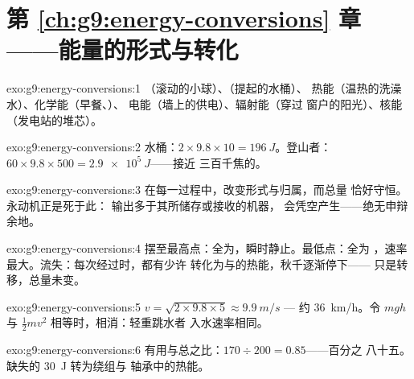 \section*{第 \ref{ch:g9:energy-conversions} 章——能量的形式与转化}

\begin{solution}{exo:g9:energy-conversions:1}
（滚动的小球）、（提起的水桶）、
热能（温热的洗澡水）、化学能（早餐、）、
电能（墙上的供电）、辐射能（穿过
窗户的阳光）、核能（发电站的堆芯）。
\end{solution}

\begin{solution}{exo:g9:energy-conversions:2}
水桶：$2 \times 9.8 \times 10 = \qty{196}{J}$。登山者：$60
\times 9.8 \times 500 = \qty{2.9e5}{J}$——接近
三百千焦的。
\end{solution}

\begin{solution}{exo:g9:energy-conversions:3}
在每一过程中，改变形式与归属，而总量
恰好守恒。永动机正是死于此：
输出多于其所储存或接收的机器，
会凭空产生——绝无申辩余地。
\end{solution}

\begin{solution}{exo:g9:energy-conversions:4}
摆至最高点：全为，瞬时静止。最低点：全为
，速率最大。流失：每次经过时，都有少许
转化为与的热能，秋千逐渐停下——
只是转移，总量未变。
\end{solution}

\begin{solution}{exo:g9:energy-conversions:5}
$v = \sqrt{2 \times 9.8 \times 5} \approx \qty{9.9}{m/s}$ ---
约 \qty{36}{km/h}。令 $m g h$ 与
$\frac12 m v^2$ 相等时，相消：轻重跳水者
入水速率相同。
\end{solution}

\begin{solution}{exo:g9:energy-conversions:6}
有用与总之比：$170 \div 200 = 0.85$——百分之
八十五。缺失的 \qty{30}{J} 转为绕组与
轴承中的热能。
\end{solution}

